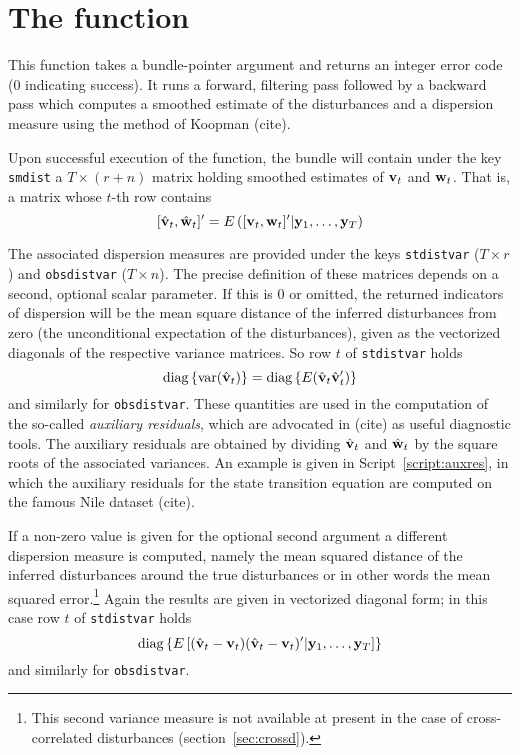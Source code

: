 \documentclass[a4paper]{article}
\begin{document}

\section{The  function}
\label{sec:kdsmooth}

This function takes a bundle-pointer argument and returns an integer
error code (0 indicating success).  It runs a forward, filtering pass
followed by a backward pass which computes a smoothed estimate of the
disturbances and a dispersion measure using the method of Koopman
(cite).

Upon successful execution of the function, the bundle will contain
under the key \texttt{smdist} a $T \times (r+n)$ matrix holding
smoothed estimates of $\mathbf{v}_t$ and $\mathbf{w}_t$. That is, a matrix
whose $t$-th row contains
\[
[\hat{\mathbf{v}}_t , \hat{\mathbf{w}}_t]' 
 = E\left( [\mathbf{v}_t , \mathbf{w}_t]' | \mathbf{y}_1, \ldots, \mathbf{y}_T \right)
\]

The associated dispersion measures are provided under the keys
\texttt{stdistvar} ($T \times r$) and \texttt{obsdistvar}
($T \times n$).  The precise definition of these matrices depends on a
second, optional scalar parameter. If this is 0 or omitted, the
returned indicators of dispersion will be the mean square distance of
the inferred disturbances from zero (the unconditional expectation of
the disturbances), given as the vectorized diagonals of the
respective variance matrices. So row $t$ of \texttt{stdistvar} holds
\[
\mbox{diag}\left\{\mbox{var}(\hat{\mathbf{v}}_t)\right\} = 
\mbox{diag}\left\{E(\hat{\mathbf{v}}_t\hat{\mathbf{v}}_t')\right\}
\]
and similarly for \texttt{obsdistvar}.  These quantities are used in
the computation of the so-called \emph{auxiliary residuals}, which are
advocated in (cite) as useful diagnostic tools. The auxiliary
residuals are obtained by dividing $\hat{\mathbf{v}}_t$ and
$\hat{\mathbf{w}}_t$ by the square roots of the associated variances. An
example is given in Script~\ref{script:auxres}, in which the auxiliary
residuals for the state transition equation are computed on the
famous Nile dataset (cite).

If a non-zero value is given for the optional second argument a
different dispersion measure is computed, namely the mean squared
distance of the inferred disturbances around the true disturbances or
in other words the mean squared error.\footnote{This second variance
  measure is not available at present in the case of cross-correlated
  disturbances (section~\ref{sec:crossd}).} Again the results are
given in vectorized diagonal form; in this case row $t$ of
\texttt{stdistvar} holds
\[
\mbox{diag}\left\{E\left[
 (\hat{\mathbf{v}}_t-\mathbf{v}_t)(\hat{\mathbf{v}}_t-\mathbf{v}_t)'
 | \mathbf{y}_1, \ldots, \mathbf{y}_T \right]\right\}
\]
and similarly for \texttt{obsdistvar}.
\end{document}
